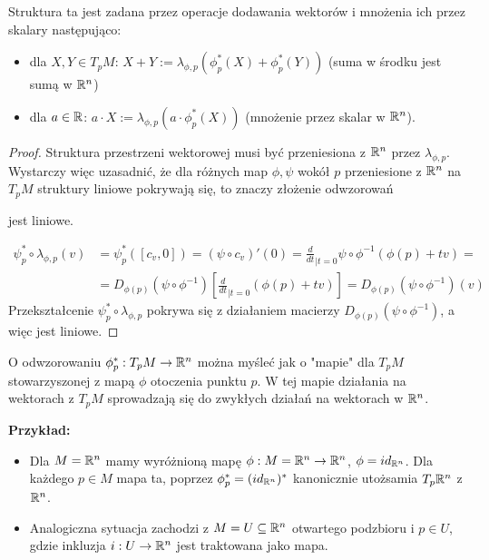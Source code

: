 Struktura ta jest zadana przez operacje dodawania wektorów i mnożenia ich przez skalary następująco:
\begin{itemize}
  \item dla $X, Y\in T_pM$: $X+Y:=\lambda_{\phi, p}(\phi^*_p(X)+\phi^*_p(Y))$ (suma w środku jest sumą w $\mathbb{R}^n$)
  \item dla $a\in\mathbb{R}$: $a\cdot X:=\lambda_{\phi, p}(a\cdot \phi_p^*(X))$ (mnożenie przez skalar w $\mathbb{R}^n$).
\end{itemize}

\begin{proof} Struktura przestrzeni wektorowej musi być przeniesiona z $\mathbb{R}^n$ przez $\lambda_{\phi, p}$. Wystarczy więc uzasadnić, że dla różnych map $\phi,\psi$ wokół $p$ przeniesione z $\mathbb{R}^n$ na $T_pM$ struktury liniowe pokrywają się, to znaczy złożenie odwzorowań

\begin{center}\end{center} 

jest liniowe.

\begin{align*}
  \psi_p^*\circ\lambda_{\phi,p}(v)&=\psi_p^*([c_v,0])=(\psi\circ c_v)'(0)=\frac{d}{dt}_{{\scriptstyle|t=0}}\psi\circ\phi^{-1}(\phi(p)+tv)=\\
                                  &=D_{\phi(p)}(\psi\circ\phi^{-1})[\frac{d}{dt}_{{\scriptstyle|t=0}}(\phi(p)+tv)]=D_{\phi(p)}(\psi\circ\phi^{-1})(v)
\end{align*}
Przekształcenie $\psi_p^*\circ\lambda_{\phi, p}$ pokrywa się z działaniem macierzy $D_{\phi(p)}(\psi\circ\phi^{-1})$, a więc jest liniowe.

\end{proof}

O odwzorowaniu $\phi_p^*:T_pM\to\mathbb{R}^n$ można myśleć jak o "mapie" dla $T_pM$ stowarzyszonej z mapą $\phi$ otoczenia punktu $p$. W tej mapie działania na wektorach z $T_pM$ sprowadzają się do zwykłych działań na wektorach w $\mathbb{R}^n$.

\label{mapa na T_pR}
\textbf{Przykład:}
\begin{itemize}
  \item Dla $M=\mathbb{R}^n$ mamy wyróżnioną mapę $\phi:M=\mathbb{R}^n\to \mathbb{R}^n$, $\phi=id_{\mathbb{R}^n}$. Dla każdego $p\in M$ mapa ta, poprzez $\phi_p^*=(id_{\mathbb{R}^n})^*$ kanonicznie utożsamia $T_p\mathbb{R}^n$ z $\mathbb{R}^n$.
  \item Analogiczna sytuacja zachodzi z $M=U\subseteq\mathbb{R}^n$ otwartego podzbioru i $p\in U$, gdzie inkluzja $i:U\to\mathbb{R}^n$ jest traktowana jako mapa.
\end{itemize}

